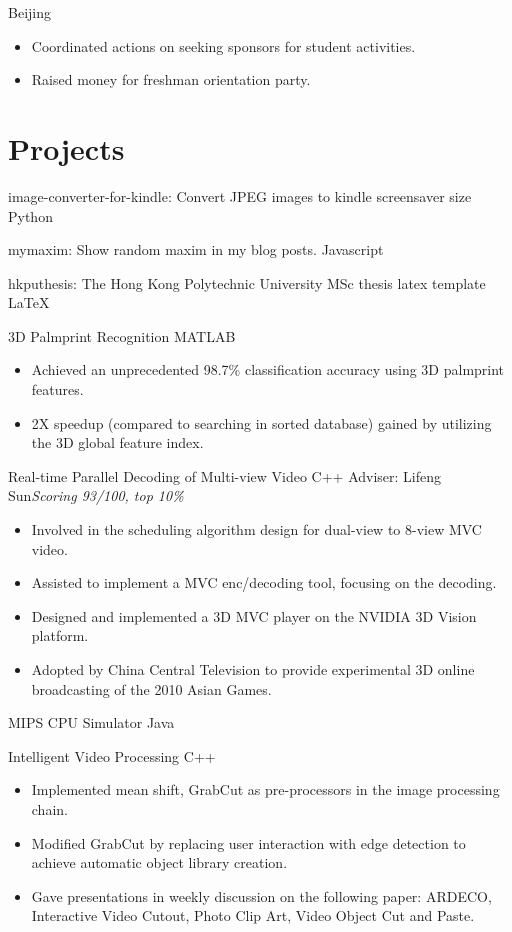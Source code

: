 \documentclass[10pt,a4paper]{moderncv/moderncv}
\begin{document}
{Beijing}{}
{
\begin{itemize}
	\item Coordinated actions on seeking sponsors for student activities.
	\item Raised money for freshman orientation party.
\end{itemize}
}

\section{Projects}

{image-converter-for-kindle: Convert JPEG images to kindle screensaver size}
{Python}
{}{}
{
}

{mymaxim: Show random maxim in my blog posts.}
{Javascript}
{}{}
{
}

{hkputhesis: The Hong Kong Polytechnic University MSc thesis latex template}
{LaTeX}
{}{}
{
}

{3D Palmprint Recognition}
{MATLAB}
{}{}
{
\begin{itemize}
	\item Achieved an unprecedented 98.7\% classification accuracy using 3D palmprint features.
	\item 2X speedup (compared to searching in sorted database) gained by utilizing the 3D global feature index.
\end{itemize}
}

{Real-time Parallel Decoding of Multi-view Video}
{C++}
{Adviser: Lifeng Sun}{\textit{Scoring 93/100, top 10\%}}
{
\begin{itemize}
	\item Involved in the scheduling algorithm design for dual-view to 8-view MVC video.
	\item Assisted to implement a MVC enc/decoding tool, focusing on the decoding.
	\item Designed and implemented a 3D MVC player on the NVIDIA 3D Vision platform.
	\item Adopted by China Central Television to provide experimental 3D online broadcasting of the 2010 Asian Games.
\end{itemize}
}

{MIPS CPU Simulator}
{Java}
{}{}
{
}

{Intelligent Video Processing}
{C++}
{}{}
{
\begin{itemize}
	\item Implemented mean shift, GrabCut as pre-processors in the image processing chain.
	\item Modified GrabCut by replacing user interaction with edge detection to achieve automatic object library creation.
	\item Gave presentations in weekly discussion on the following paper: ARDECO, Interactive Video Cutout, Photo Clip Art, Video Object Cut and Paste.
\end{itemize}
}
\end{document}
